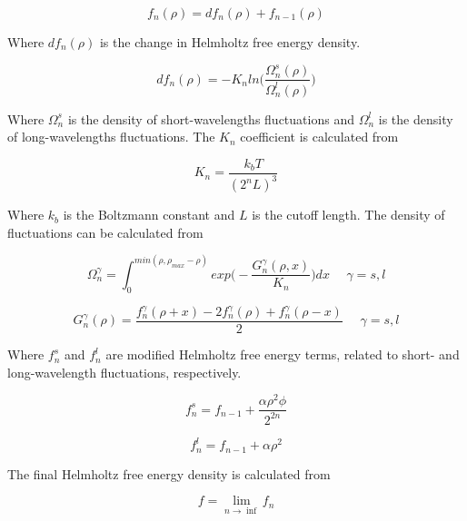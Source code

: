 \documentclass[preprint,12pt,3p]{elsarticle}
\begin{document}
\begin{equation} \label{eq:fn}
    f_{n}(\rho) = df_{n}(\rho) + f_{n-1}(\rho)
\end{equation}

    Where $df_{n}(\rho)$ is the change in Helmholtz free energy density.

\begin{equation} \label{eq:dfn}
    df_{n}(\rho) = -K_{n} ln\Bigg(\frac{\Omega_{n}^{s}(\rho)}{\Omega_{n}^{l}(\rho)}\Bigg)
\end{equation}

    Where $\Omega_{n}^{s}$ is the density of short-wavelengths fluctuations and $\Omega_{n}^{l}$ is the density of long-wavelengths fluctuations. The $K_{n}$ coefficient is calculated from

\begin{equation} \label{eq:Kn}
    K_{n} = \frac{k_{b}T}{(2^{n}L)^3}
\end{equation}

    Where $k_{b}$ is the Boltzmann constant and $L$ is the cutoff length. The density of fluctuations can be calculated from
    
\begin{equation} \label{eq:Omega}
    \Omega_{n}^{\gamma} = \int_{0}^{min(\rho,\rho_{max}-\rho)}exp\Bigg(-\frac{G_{n}^{\gamma}(\rho,x)}{K_{n}}\Bigg)dx \ \ \ \ \ \   \gamma = s,l
\end{equation}

\begin{equation} \label{eq:Gn}
    G_{n}^{\gamma}(\rho) = \frac{f_{n}^{\gamma}(\rho+x)-2f_{n}^{\gamma}(\rho)+f_{n}^{\gamma}(\rho-x)}{2} \ \ \ \ \ \   \gamma = s,l
\end{equation}

    Where $f_{n}^{s}$ and $f_{n}^{l}$ are modified Helmholtz free energy terms, related to short- and long-wavelength fluctuations, respectively.

\begin{equation} \label{eq:fns}
    f_{n}^{s} = f_{n-1} + \frac{\alpha \rho^2 \phi}{2^{2n}}
\end{equation}

\begin{equation} \label{eq:fnl}
    f_{n}^{l} = f_{n-1} + \alpha\rho^2
\end{equation}

    The final Helmholtz free energy density is calculated from
    
\begin{equation} \label{eq:ff}
    f = \lim_{n\rightarrow \inf} f_{n} 
\end{equation}
  
\end{document}
